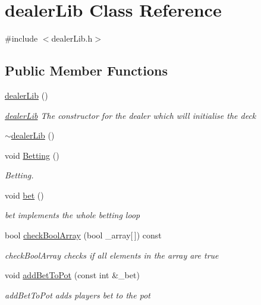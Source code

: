 \hypertarget{classdealerLib}{\section{dealer\-Lib Class Reference}
\label{classdealerLib}
}


{\ttfamily \#include $<$dealer\-Lib.\-h$>$}

\subsection*{Public Member Functions}
\begin{DoxyCompactItemize}
\item 
\hyperlink{classdealerLib_a672938057486d6916efcb3ae5cb53ea2}{dealer\-Lib} ()
\begin{DoxyCompactList}\small\item\em \hyperlink{classdealerLib}{dealer\-Lib} The constructor for the dealer which will initialise the deck \end{DoxyCompactList}\item 
\hyperlink{classdealerLib_ae4f26ca24eb2ffee9e93558f3c4634a4}{$\sim$dealer\-Lib} ()
\item 
void \hyperlink{classdealerLib_a846d61ce1080938cab74c82afeca23bb}{Betting} ()
\begin{DoxyCompactList}\small\item\em Betting. \end{DoxyCompactList}\item 
void \hyperlink{classdealerLib_a4580832480ff12ddfcd91852ccef85a9}{bet} ()
\begin{DoxyCompactList}\small\item\em bet implements the whole betting loop \end{DoxyCompactList}\item 
bool \hyperlink{classdealerLib_a221f9fb86831e0b5c9f0ac997f7f6a80}{check\-Bool\-Array} (bool \-\_\-array\mbox{[}$\,$\mbox{]}) const 
\begin{DoxyCompactList}\small\item\em check\-Bool\-Array checks if all elements in the array are true \end{DoxyCompactList}\item 
void \hyperlink{classdealerLib_a7e2dfc44e542046043b2387b12b5a0c2}{add\-Bet\-To\-Pot} (const int \&\-\_\-bet)
\begin{DoxyCompactList}\small\item\em add\-Bet\-To\-Pot adds players bet to the pot \end{DoxyCompactList}\item 

\end{DoxyCompactItemize}
